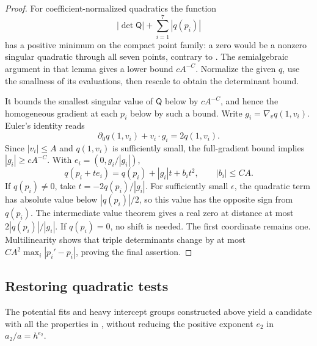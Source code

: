 \begin{proof}
For coefficient-normalized quadratics the function
\[
 |\det\mathsf Q|+\sum_{i=1}^7|q(p_i)|
\]
has a positive minimum on the compact point family:
a zero would be a nonzero singular quadratic through all seven
points, contrary to .
The semialgebraic argument in that lemma gives a lower bound
\(cA^{-C}\). Normalize the given \(q\), use the smallness of
its evaluations, then rescale to obtain the determinant bound.

It bounds the smallest singular value of \(\mathsf Q\) below
by \(cA^{-C}\), and hence the homogeneous gradient at each
\(p_i\) below by such a bound. Write
\(g_i=\nabla_vq(1,v_i)\).
Euler's identity reads
\[
 \partial_0q(1,v_i)+v_i\cdot g_i=2q(1,v_i).
\]
Since \(|v_i|\leq A\) and \(q(1,v_i)\) is sufficiently small,
the full-gradient bound implies \(|g_i|\geq cA^{-C}\).
With \(e_i=(0,g_i/|g_i|)\),
\[
 q(p_i+te_i)=q(p_i)+|g_i|t+b_it^2,\qquad |b_i|\leq CA.
\]
If \(q(p_i)\ne0\), take \(t=-2q(p_i)/|g_i|\).
For sufficiently small \(\epsilon\), the quadratic term has
absolute value below \(|q(p_i)|/2\), so this value has the
opposite sign from \(q(p_i)\).
The intermediate value theorem gives a real zero at distance
at most \(2|q(p_i)|/|g_i|\). If \(q(p_i)=0\), no shift is needed.
The first coordinate remains one. Multilinearity shows that
triple determinants change by at most
\(CA^2\max_i|p_i'-p_i|\), proving the final assertion.
\end{proof}

\subsection{Restoring quadratic tests}

\begin{proposition}\label{prop:degree-restoration}
The potential fits and heavy intercept groups constructed above
yield a candidate with all the properties in
, without reducing the
positive exponent \(e_2\) in \(a_2/a=h^{e_2}\).
\end{proposition}

